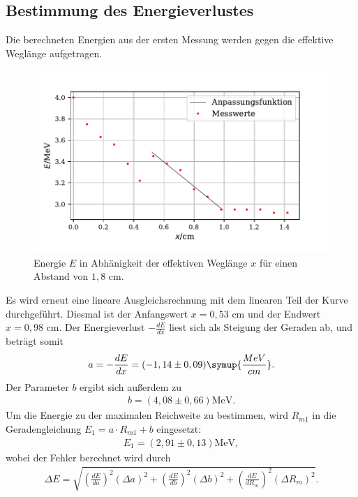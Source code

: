 \subsection{Bestimmung des Energieverlustes}
Die berechneten Energien aus der ersten Messung werden gegen die effektive Weglänge aufgetragen. 
\begin{figure}[H]
  \centering
  \includegraphics{plot3.pdf}
  \caption{Energie $E$ in Abhänigkeit der effektiven Weglänge $x$ für einen Abstand von $1,8$ $\si{\cm}$. }
  \label{fig:plot}
\end{figure}
\noindent Es wird erneut eine lineare Ausgleichsrechnung mit dem linearen Teil der Kurve durchgeführt. Diesmal ist der Anfangswert $x=0,53$ $\si{\cm}$ und der Endwert $x=0,98$ $\si{\cm}$.  Der Energieverlust $-\frac{dE}{dx}$
liest sich als Steigung der Geraden ab, und beträgt somit
\begin{align*}
a = -\frac{dE}{dx} = (-1,14 \pm 0,09) \symup{\frac{MeV}{cm}} .
\end{align*}
Der Parameter $b$ ergibt sich außerdem zu
\begin{align*}
b = (4,08 \pm 0,66) \si{\MeV}.
\end{align*}
Um die Energie zu der maximalen Reichweite zu bestimmen, wird $R_{m1}$ in die Geradengleichung $E_1 = a \cdot R_{m1} + b$ eingesetzt:
\begin{align*}
E_1 = (2,91 \pm 0,13) \si{\MeV}, %
\end{align*}
wobei der Fehler berechnet wird durch
\begin{align*}
\Delta E = \sqrt{(\frac{dE}{da})^2 (\Delta a)^2 + (\frac{dE}{db})^2 (\Delta b)^2 + (\frac{dE}{dR_m})^2 (\Delta R_m)^2}.
\end{align*}


